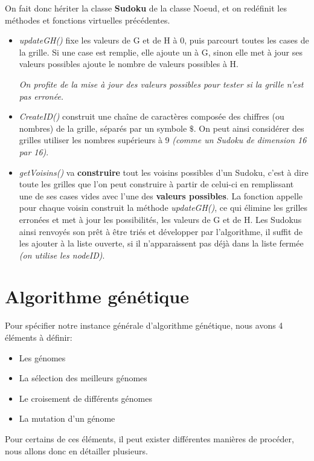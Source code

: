 \begin{description}
On fait donc hériter la classe \textbf{Sudoku} de la classe Noeud, et on redéfinit les méthodes et fonctions virtuelles précédentes.

\begin{itemize}

\item \textit{updateGH()} fixe les valeurs de G et de H à 0, puis parcourt toutes les cases de la grille. Si une case est remplie, elle ajoute un à G, sinon elle met à jour ses valeurs possibles ajoute le nombre de valeurs possibles à H.

\textit{On profite de la mise à jour des valeurs possibles pour tester si la grille n'est pas erronée.}

\item \textit{CreateID()} construit une chaîne de caractères composée des chiffres (ou nombres) de la grille, séparés par un symbole $\$$. On peut ainsi considérer des grilles utiliser les nombres supérieurs à 9 \textit{(comme un Sudoku de dimension 16 par 16)}.


\item \textit{getVoisins()} va \textbf{construire} tout les voisins possibles d'un Sudoku, c'est à dire toute les grilles que l'on peut construire à partir de celui-ci en remplissant une de ses cases vides avec l'une des \textbf{valeurs possibles}. La fonction appelle pour chaque voisin construit la méthode \textit{updateGH()}, ce qui élimine les grilles erronées et met à jour les possibilités, les valeurs de G et de H. Les Sudokus ainsi renvoyés son prêt à être triés et développer par l'algorithme, il suffit de les ajouter à la liste ouverte, si il n’apparaissent pas déjà dans la liste fermée \textit{(on utilise les nodeID)}.

\end{itemize}
              

          \end{description}  
              
 
    \section{Algorithme génétique}
        Pour spécifier notre instance générale d'algorithme génétique, nous avons 4 éléments à définir:
        \begin{itemize}
            \item Les génomes
            \item La sélection des meilleurs génomes
            \item Le croisement de différents génomes
            \item La mutation d'un génome
        \end{itemize}
        Pour certains de ces éléments, il peut exister différentes manières de procéder, nous allons donc en détailler plusieurs.
